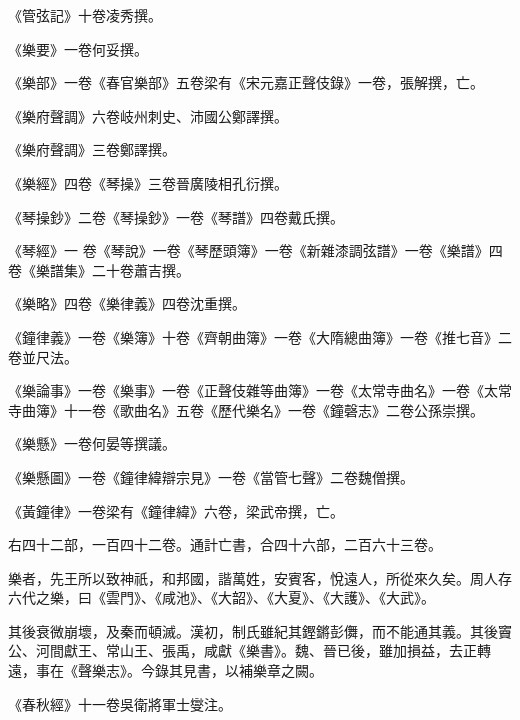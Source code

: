 \begin{pinyinscope}
 《管弦記》十卷凌秀撰。



 《樂要》一卷何妥撰。



 《樂部》一卷《春官樂部》五卷梁有《宋元嘉正聲伎錄》一卷，張解撰，亡。



 《樂府聲調》六卷岐州刺史、沛國公鄭譯撰。



 《樂府聲調》三卷鄭譯撰。



 《樂經》四卷《琴操》三卷晉廣陵相孔衍撰。



 《琴操鈔》二卷《琴操鈔》一卷《琴譜》四卷戴氏撰。



 《琴經》一
 卷《琴說》一卷《琴歷頭簿》一卷《新雜漆調弦譜》一卷《樂譜》四卷《樂譜集》二十卷蕭吉撰。



 《樂略》四卷《樂律義》四卷沈重撰。



 《鐘律義》一卷《樂簿》十卷《齊朝曲簿》一卷《大隋總曲簿》一卷《推七音》二卷並尺法。



 《樂論事》一卷《樂事》一卷《正聲伎雜等曲簿》一卷《太常寺曲名》一卷《太常寺曲簿》十一卷《歌曲名》五卷《歷代樂名》一卷《鐘磬志》二卷公孫崇撰。



 《樂懸》一卷何晏等撰議。



 《樂懸圖》一卷《鐘律緯辯宗見》一卷《當管七聲》二卷魏僧撰。



 《黃鐘律》一卷梁有《鐘律緯》六卷，梁武帝撰，亡。



 右四十二部，一百四十二卷。通計亡書，合四十六部，二百六十三卷。



 樂者，先王所以致神祇，和邦國，諧萬姓，安賓客，悅遠人，所從來久矣。周人存六代之樂，曰《雲門》、《咸池》、《大韶》、《大夏》、《大護》、《大武》。



 其後衰微崩壞，及秦而頓滅。漢初，制氏雖紀其鏗鏘彭儛，而不能通其義。其後竇公、河間獻王、常山王、張禹，咸獻《樂書》。魏、晉已後，雖加損益，去正轉遠，事在《聲樂志》。今錄其見書，以補樂章之闕。



 《春秋經》十一卷吳衛將軍士燮注。




\end{pinyinscope}
